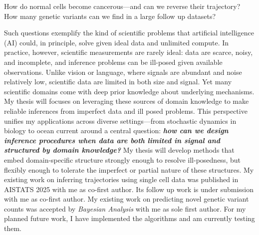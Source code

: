 

How do normal cells become cancerous---and can we reverse their trajectory? How many genetic variants can we find in a large follow up datasets? 

Such questions exemplify the kind of scientific problems that artificial intelligence (AI) could, in principle, solve given ideal data and unlimited compute. In practice, however, scientific measurements are rarely ideal: data are scarce, noisy, and incomplete, and inference problems can be ill-posed given available observations. Unlike vision or language, where signals are abundant and noise relatively low, scientific data are limited in both size and signal. Yet many scientific domains come with deep prior knowledge about underlying mechanisms. My thesis will focuses on leveraging these sources of domain knowledge to make reliable inferences from imperfect data and ill posed problems. This perspective unifies my applications across diverse settings---from stochastic dynamics in biology to ocean current around a central question: \textit{\textbf{how can we design inference procedures when data are both limited in signal and structured by domain knowledge?}} My thesis will develop methods that embed domain-specific structure strongly enough to resolve ill-posedness, but flexibly enough to tolerate the imperfect or partial nature of these structures. My existing work on inferring trajectories using single cell data \cite{shen2025multi} was published in AISTATS 2025 with me as co-first author. Its follow up work \cite{berlinghieri2025oh} is under submission with me as co-first author. My existing work on predicting novel genetic variant counts \cite{shen2022double_trouble_journal} was accepted by \textit{Bayesian Analysis} with me as sole first author. For my planned future work, I have implemented the algorithms and am currently testing them.



